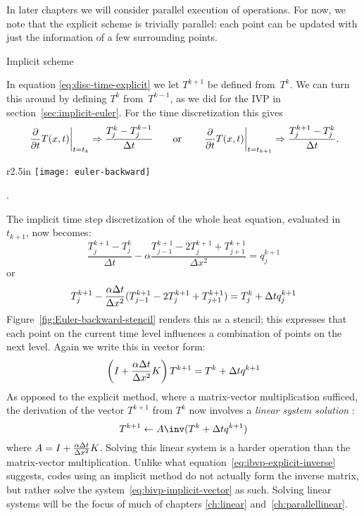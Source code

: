 In later chapters we will consider parallel execution of operations.
For now, we note that the explicit scheme is trivially parallel: 
each point can be updated with just the information of a few surrounding
points.

 {Implicit scheme}

In equation \eqref{eq:disc-time-explicit} we let $T^{k+1}$ be defined
from~$T^k$. We can turn this around by defining $T^k$ from~$T^{k-1}$,
as we did for the \ac{IVP} in section~\ref{sec:implicit-euler}. For
the time discretization this gives
\begin{equation}
  \left.\frac\partial{\partial t}T(x,t)\right|_{t=t_k}
  \Rightarrow
  \frac{T_j^k-T_j^{k-1}}{\Delta t}
  \qquad\hbox{or}\qquad
  \left.\frac\partial{\partial t}T(x,t)\right|_{t=t_{k+1}}
  \Rightarrow
  \frac{T_j^{k+1}-T_j^k}{\Delta t}.
  \label{eq:heat-time-explicit}
\end{equation}

\begin{wrapfigure}{r}{2.5in}
  \leavevmode\kern\unitindent 
  \texttt{[image: euler-backward]}
  \caption{The difference stencil of the Euler backward method for the
    heat equation.}
  \label{fig:Euler-backward-stencil}.
\end{wrapfigure}
%
The implicit time step discretization of the whole heat equation,
evaluated in~$t_{k+1}$, now becomes:
\begin{equation}
  \frac{T_j^{k+1}-T_j^k}{\Delta t}-\alpha
  \frac{T_{j-1}^{k+1}-2T_j^{k+1}+T_{j+1}^{k+1}}{\Delta x^2}=q_j^{k+1} 
\end{equation}
or
\begin{equation}
  \label{eq:bivp-implicit}
  T_j^{k+1}-\frac{\alpha\Delta t}{\Delta x^2}
  (T_{j-1}^{k+1}-2T_j^{k+1}+T_{j+1}^{k+1})=T_j^k+\Delta t q_j^{k+1}
\end{equation}
Figure~\ref{fig:Euler-backward-stencil} renders this as a stencil;
this expresses that each point on the current time level influences a
combination of points on the next level.
Again we write this in vector form:
\begin{equation}
  \label{eq:bivp-implicit-vector}
  \left(I+\frac{\alpha\Delta t}{\Delta x^2} K\right) T^{k+1}=
   T^k+\Delta t q^{k+1}
\end{equation}
As opposed to the explicit method, where a matrix-vector
multiplication sufficed, the derivation of the vector $ T^{k+1}$ 
from $ T^k$ now involves a
\emph{linear system solution}%
:
\begin{equation}
  T^{k+1}\leftarrow A\inv (T^k+\Delta tq^{k+1})
  \label{eq:ibvp-explicit-inverse}
\end{equation}
where $A=I+\frac{\alpha\Delta t}{\Delta x^2} K$.
Solving this linear system is a harder operation than the matrix-vector
multiplication.
Unlike what equation~\eqref{eq:ibvp-explicit-inverse} suggests,
codes using an implicit method do not actually form the inverse matrix,
but rather solve the system~\eqref{eq:bivp-implicit-vector} as such.
Solving linear systems
will be the focus of much of chapters \ref{ch:linear}
and~\ref{ch:parallellinear}.

